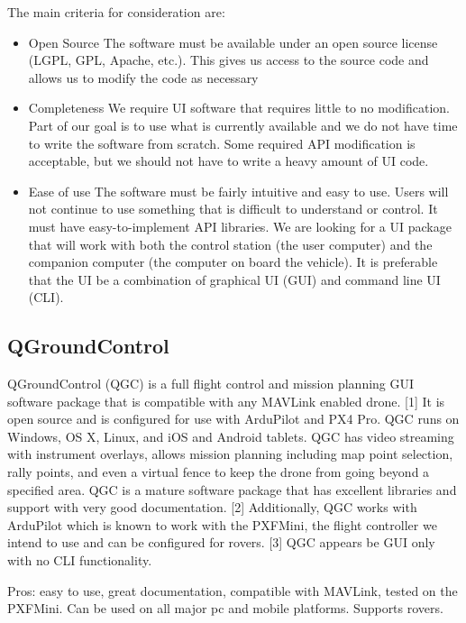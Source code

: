 \documentclass[compsoc,draftclsnofoot,onecolumn,10pt]{IEEEtran}
\begin{document}
The main criteria for consideration are:
\begin{itemize}
	
	\item Open Source
		\subitem
		The software must be available under an open source license
		(LGPL, GPL, Apache, etc.). This gives us access to the source code and allows
		us to modify the code as necessary
		
	\item Completeness
		\subitem
		 We require UI software that requires little to
		 no modification. Part of our goal is to use what is currently available and
		 we do not have time to write the software from scratch. Some required API 
		 modification is acceptable, but we should not have to write a heavy amount
		 of UI code.	
		
	\item Ease of use
		\subitem
		The software must be fairly intuitive and easy to use. Users will not continue
		to use something that is difficult to understand or control. It must have 
		easy-to-implement API libraries. We are looking	for a UI package that will work
		 with both the control station (the user computer) and the companion computer 
		 (the computer on board the vehicle). It is	preferable that the UI be a combination
		  of graphical UI (GUI) and command line UI (CLI).
	
\end{itemize}
 

\subsection{QGroundControl}

QGroundControl (QGC) is a full flight control and mission planning GUI software
package that is compatible with any MAVLink enabled drone. [1] It is open source and
is configured for use with ArduPilot and PX4 Pro. QGC runs on Windows, OS X,
Linux, and iOS and Android tablets. QGC has video streaming with instrument
overlays, allows mission planning including map point selection, rally points,
and even a virtual fence to keep the drone from going beyond a specified area.
QGC is a mature software package that has excellent libraries and support with
very good documentation. [2]
Additionally, QGC works with ArduPilot which is known to work with the PXFMini,
the flight controller we intend to use and can be configured for rovers. [3] QGC 
appears be GUI only with no CLI functionality.

Pros: easy to use, great documentation, compatible with MAVLink, tested on the
PXFMini. Can be used on all major pc and mobile platforms. Supports rovers.
\end{document}

